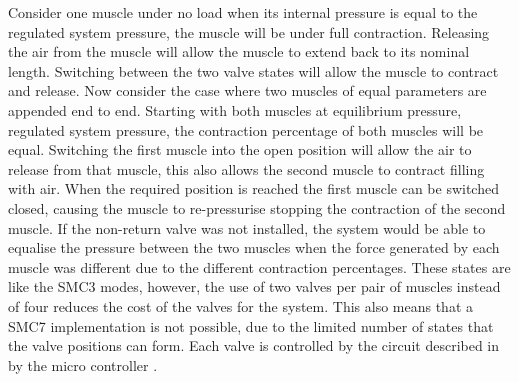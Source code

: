 \documentclass[11pt,a4paper]{article}
\begin{document}
\begin{figure}[hbt!]
{
    }
    \label{fig:pneumatic_valve}
\end{figure}

Consider one muscle under no load when its internal pressure is equal to the regulated system pressure, the muscle will be under full contraction. Releasing the air from the muscle will allow the muscle to extend back to its nominal length. Switching between the two valve states will allow the muscle to contract and release. Now consider the case where two muscles of equal parameters are appended end to end. Starting with both muscles at equilibrium pressure, regulated system pressure, the contraction percentage of both muscles will be equal. Switching the first muscle into the open position will allow the air to release from that muscle, this also allows the second muscle to contract filling with air. When the required position is reached the first muscle can be switched closed, causing the muscle to re-pressurise stopping the contraction of the second muscle. If the non-return valve was not installed, the system would be able to equalise the pressure between the two muscles when the force generated by each muscle was different due to the different contraction percentages. These states are like the SMC3 modes, however, the use of two valves per pair of muscles instead of four reduces the cost of the valves for the system. This also means that a SMC7 implementation is not possible, due to the limited number of states that the valve positions can form.
Each valve is controlled by the circuit described in  by the micro controller .
\end{document}
